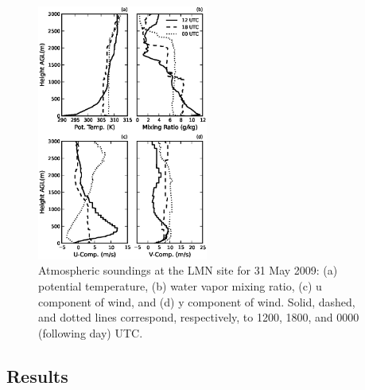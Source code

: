\begin{figure}[H]
\begin{center}
\includegraphics[width=0.5\textwidth]{figures/chapter4/20090531_lmnsounding}
\end{center}
\caption{Atmospheric soundings at the LMN site for 31 May 2009: (a) potential temperature, (b) water vapor mixing ratio, (c) u component of wind, and (d) y component of wind. Solid, dashed, and dotted lines correspond, respectively, to 1200, 1800, and 0000 (following day) UTC.}
\label{figure435}
\end{figure}


\subsection{Results}
\label{res-472}


